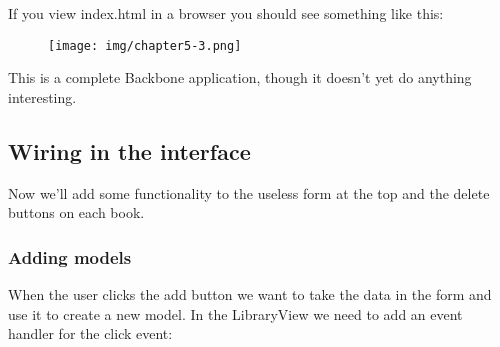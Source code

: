 \documentclass[9pt]{book}
\newenvironment{Shaded}{}{}
\newcommand{\KeywordTok}[1]{\textcolor[rgb]{0.00,0.44,0.13}{\textbf{{#1}}}}
\newcommand{\StringTok}[1]{\textcolor[rgb]{0.25,0.44,0.63}{{#1}}}
\newcommand{\OtherTok}[1]{\textcolor[rgb]{0.00,0.44,0.13}{{#1}}}
\newcommand{\FunctionTok}[1]{\textcolor[rgb]{0.02,0.16,0.49}{{#1}}}
\newcommand{\NormalTok}[1]{{#1}}
\begin{document}
If you view index.html in a browser you should see something like this:

\begin{figure}[htbp]
\centering
\texttt{[image: img/chapter5-3.png]}
\end{figure}

This is a complete Backbone application, though it doesn't yet do
anything interesting.

\subsection{Wiring in the interface}\label{wiring-in-the-interface}

Now we'll add some functionality to the useless form at the top and the
delete buttons on each book.

\subsubsection{Adding models}\label{adding-models}

When the user clicks the add button we want to take the data in the form
and use it to create a new model. In the LibraryView we need to add an
event handler for the click event:

\begin{Shaded}
\end{Shaded}
\end{document}
